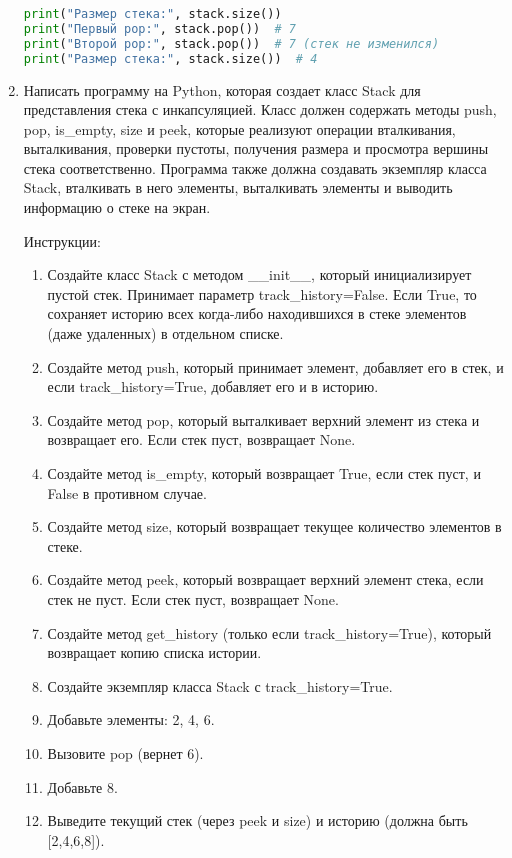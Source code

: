 \begin{enumerate}
\begin{lstlisting}[language=Python]
print("Размер стека:", stack.size())
print("Первый pop:", stack.pop())  # 7
print("Второй pop:", stack.pop())  # 7 (стек не изменился)
print("Размер стека:", stack.size())  # 4
\end{lstlisting}

\item Написать программу на Python, которая создает класс Stack для представления стека с инкапсуляцией. Класс должен содержать методы push, pop, is\_empty, size и peek, которые реализуют операции вталкивания, выталкивания, проверки пустоты, получения размера и просмотра вершины стека соответственно. Программа также должна создавать экземпляр класса Stack, вталкивать в него элементы, выталкивать элементы и выводить информацию о стеке на экран.

Инструкции:
\begin{enumerate}
    \item Создайте класс Stack с методом \_\_init\_\_, который инициализирует пустой стек. Принимает параметр track\_history=False. Если True, то сохраняет историю всех когда-либо находившихся в стеке элементов (даже удаленных) в отдельном списке.
    \item Создайте метод push, который принимает элемент, добавляет его в стек, и если track\_history=True, добавляет его и в историю.
    \item Создайте метод pop, который выталкивает верхний элемент из стека и возвращает его. Если стек пуст, возвращает None.
    \item Создайте метод is\_empty, который возвращает True, если стек пуст, и False в противном случае.
    \item Создайте метод size, который возвращает текущее количество элементов в стеке.
    \item Создайте метод peek, который возвращает верхний элемент стека, если стек не пуст. Если стек пуст, возвращает None.
    \item Создайте метод get\_history (только если track\_history=True), который возвращает копию списка истории.
    \item Создайте экземпляр класса Stack с track\_history=True.
    \item Добавьте элементы: 2, 4, 6.
    \item Вызовите pop (вернет 6).
    \item Добавьте 8.
    \item Выведите текущий стек (через peek и size) и историю (должна быть [2,4,6,8]).
\end{enumerate}


\end{enumerate}
